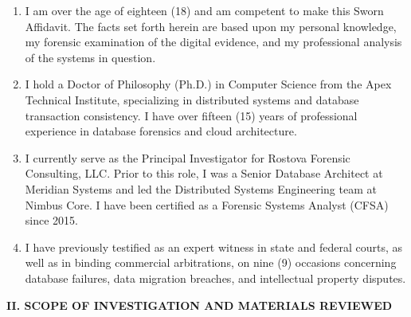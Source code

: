\documentclass[12pt,letterpaper]{article}
\begin{document}
\begin{enumerate}[label=\arabic*., leftmargin=0.4in, rightmargin=0.1in, align=left]
  \item I am over the age of eighteen (18) and am competent to make this Sworn Affidavit. The facts set forth herein are based upon my personal knowledge, my forensic examination of the digital evidence, and my professional analysis of the systems in question.
  
  \item I hold a Doctor of Philosophy (Ph.D.) in Computer Science from the Apex Technical Institute, specializing in distributed systems and database transaction consistency. I have over fifteen (15) years of professional experience in database forensics and cloud architecture.
  
  \item I currently serve as the Principal Investigator for Rostova Forensic Consulting, LLC. Prior to this role, I was a Senior Database Architect at Meridian Systems and led the Distributed Systems Engineering team at Nimbus Core. I have been certified as a Forensic Systems Analyst (CFSA) since 2015.
  
  \item I have previously testified as an expert witness in state and federal courts, as well as in binding commercial arbitrations, on nine (9) occasions concerning database failures, data migration breaches, and intellectual property disputes.
\end{enumerate}

\par\vspace{1.0em}

\begin{center}
  \textbf{\textcolor{LegalNavy}{\MakeUppercase{II. Scope of Investigation and Materials Reviewed}}}
\end{center}
\par\vspace{0.3em}
\end{document}
